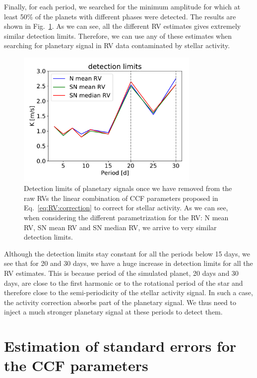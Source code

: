 \documentclass{aa}
\begin{document}
{Finally, for each period, we searched for the minimum amplitude for which at least 50\% of the planets with different phases were detected. The results are shown in Fig.~\ref{fig:detection_limits}. As we can see, all the different RV estimates gives extremely similar detection limits. Therefore, we can use any of these estimates when searching for planetary signal in RV data contaminated by stellar activity.

\begin{figure}[!h]
\begin{center}
\includegraphics[height = 2.6in]{detection_limits.pdf} 
   \caption{Detection limits of planetary signals once we have removed from the raw RVs the linear combination of CCF parameters proposed in Eq.~\ref{eq:RV:correction} to correct for stellar activity. As we can see, when considering the different parametrization for the RV: N mean RV, SN mean RV and SN median RV, we arrive to very similar detection limits.}
   \label{fig:detection_limits}
\end{center}
\end{figure}

Although the detection limits stay constant for all the periods below 15 days, we see that for 20 and 30 days, we have a huge increase in detection limits for all the RV estimates. 
This is because period of the simulated planet, 20 days and 30 days, are close to the first harmonic or to the rotational period of the star \citep[36.7 days,][]{Dumusque-2012}
and therefore close to the semi-periodicity of the stellar activity signal. In such a case, the activity 
correction absorbs part of the planetary signal. We thus need to inject a much stronger planetary signal at these periods to detect them.}


\section{Estimation of standard errors for the CCF parameters} \label{sec:5}
\end{document}
